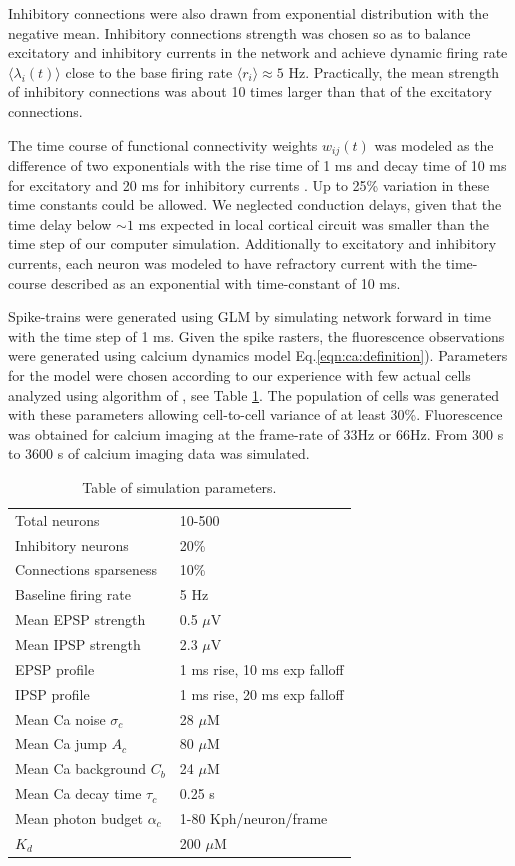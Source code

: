 Inhibitory connections were also drawn from exponential distribution with the negative mean. Inhibitory connections strength was chosen so as to balance excitatory and inhibitory currents in the network and achieve dynamic firing rate $\langle \lambda_i(t) \rangle$ close to the base firing rate $\langle r_i\rangle \approx 5 $ Hz. Practically, the mean strength of inhibitory connections was about 10 times larger than that of the excitatory connections. 

The time course of functional connectivity weights $w_{ij}(t)$ was modeled as the difference of two exponentials with the rise time of 1 ms and decay time of 10 ms for excitatory and 20 ms for inhibitory currents \cite{Sayer1990}. Up to 25\% variation in these time constants could be allowed. We neglected conduction delays, given that the time delay below $\sim 1$ ms expected in local cortical circuit was smaller than the time step of our computer simulation.  Additionally to excitatory and inhibitory currents, each neuron was modeled to have refractory current with the time-course described as an exponential with time-constant of 10 ms.

Spike-trains were generated using GLM by simulating network forward in time with the time step of 1 ms.  Given the spike rasters, the fluorescence observations were generated using calcium dynamics model Eq.\eqref{eqn:ca:definition}). Parameters for the model were chosen according to our experience with few actual cells analyzed using algorithm of \cite{Vogelstein2009}, see Table \ref{table:caparm}.  The population of cells was generated with these parameters allowing cell-to-cell variance of at least 30\%.  Fluorescence was obtained for calcium imaging at the frame-rate of 33Hz or 66Hz.  From 300 s to 3600 s of calcium imaging data was simulated.

\begin{table}[h!b!p!]
\caption{Table of simulation parameters.}\label{table:caparm}
\begin{tabular}{ll}
\hline
Total neurons & 10-500 \\
Inhibitory neurons & 20\% \\
Connections sparseness & 10\% \\
Baseline firing rate & 5 Hz \\
Mean EPSP strength & 0.5 $\mu$V \\
Mean IPSP strength & 2.3 $\mu$V\\
EPSP profile & 1 ms rise, 10 ms exp falloff \\
IPSP profile & 1 ms rise, 20 ms exp falloff \\
\hline
Mean Ca noise $\sigma_c$ & 28 $\mu$M \\
Mean Ca jump $A_c$ & 80 $\mu$M \\
Mean Ca background $C_b$ & 24 $\mu$M \\
Mean Ca decay time $\tau_c$ & 0.25 s \\
Mean photon budget $\alpha_c$ & 1-80 Kph/neuron/frame \\
$K_d$ & 200 $\mu$M \\
\hline
\end{tabular}
\end{table}

